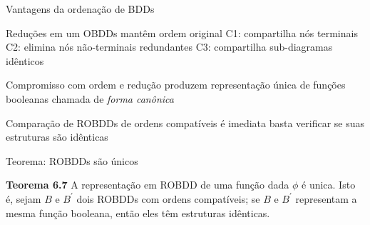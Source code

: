 \expandafter\documentclass\expandafter[table, usenames, svgnames, dvipsnames,14pt, \classopts]{beamer}
\begin{document}
\begin{frame}{Vantagens da ordenação de BDDs}

    \begin{outline}
        \1 Reduções em um OBDDs mantêm ordem original
            \2[-] C1: compartilha nós terminais
            \2[-] C2: elimina nós não-terminais redundantes
            \2[-] C3: compartilha sub-diagramas idênticos
        
        \vspace{1em}
        
        \1 Compromisso com ordem e redução produzem representação única de funções booleanas
            \2[-] chamada de \textit{forma canônica}

            \vspace{1em}
            
        \1 Comparação de ROBDDs de ordens compatíveis é imediata
            \2[-] basta verificar se suas estruturas são idênticas
    \end{outline}

\end{frame}

\begin{frame}{Teorema: ROBDDs são únicos}

    \begin{block}{\textbf{Teorema 6.7}}
        A representação em ROBDD de uma função dada $\phi$ é unica. Isto é, sejam $B$ e $B^\prime$ dois ROBDDs com ordens compatíveis; se $B$ e $B^\prime$ representam a mesma função booleana, então eles têm estruturas idênticas.
    \end{block}

\end{frame}
\end{document}
